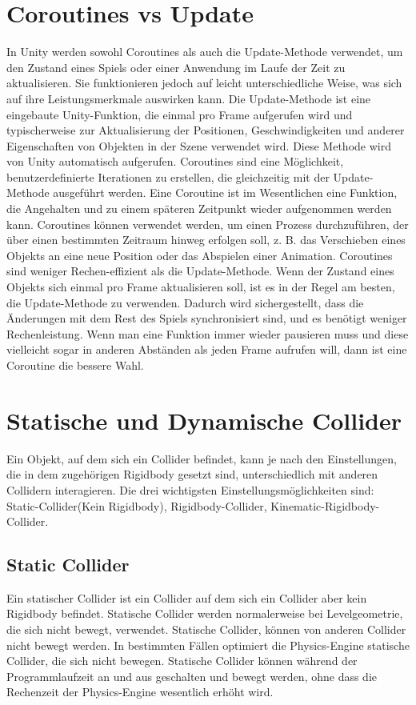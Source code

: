 \section{Coroutines vs Update}
In Unity werden sowohl Coroutines als auch die Update-Methode verwendet, um den Zustand eines Spiels oder einer Anwendung im Laufe der Zeit zu aktualisieren. Sie funktionieren jedoch auf leicht unterschiedliche Weise, was sich auf ihre Leistungsmerkmale auswirken kann. Die Update-Methode ist eine eingebaute Unity-Funktion, die einmal pro Frame aufgerufen wird und typischerweise zur Aktualisierung der Positionen, Geschwindigkeiten und anderer Eigenschaften von Objekten in der Szene verwendet wird. Diese Methode wird von Unity automatisch aufgerufen. Coroutines sind eine Möglichkeit, benutzerdefinierte Iterationen zu erstellen, die gleichzeitig mit der Update-Methode ausgeführt werden. Eine Coroutine ist im Wesentlichen eine Funktion, die Angehalten und zu einem späteren Zeitpunkt wieder aufgenommen werden kann. Coroutines können verwendet werden, um einen Prozess durchzuführen, der über einen bestimmten Zeitraum hinweg erfolgen soll, z. B. das Verschieben eines Objekts an eine neue Position oder das Abspielen einer Animation. Coroutines sind weniger Rechen-effizient als die Update-Methode. Wenn der Zustand eines Objekts sich einmal pro Frame aktualisieren soll, ist es in der Regel am besten, die Update-Methode zu verwenden. Dadurch wird sichergestellt, dass die Änderungen mit dem Rest des Spiels synchronisiert sind, und es benötigt weniger Rechenleistung. Wenn man eine Funktion immer wieder pausieren muss und diese vielleicht sogar in anderen Abständen als jeden Frame aufrufen will, dann ist eine Coroutine die bessere Wahl.
\cite{_dickinson2015unity}

\section{Statische und Dynamische Collider}
Ein Objekt, auf dem sich ein Collider befindet, kann je nach den Einstellungen, die in dem zugehörigen Rigidbody gesetzt sind, unterschiedlich mit anderen Collidern interagieren. Die drei wichtigsten Einstellungsmöglichkeiten sind: Static-Collider(Kein Rigidbody), Rigidbody-Collider, Kinematic-Rigidbody-Collider.
\cite{_staticCollider}

\subsection{Static Collider}
Ein statischer Collider ist ein Collider auf dem sich ein Collider aber kein Rigidbody befindet. Statische Collider werden normalerweise bei Levelgeometrie, die sich nicht bewegt, verwendet. Statische Collider, können von anderen Collider nicht bewegt werden. In bestimmten Fällen optimiert die Physics-Engine statische Collider, die sich nicht bewegen. Statische Collider können während der Programmlaufzeit an und aus geschalten und bewegt werden, ohne dass die Rechenzeit der Physics-Engine wesentlich erhöht wird.
\cite{_staticCollider}

